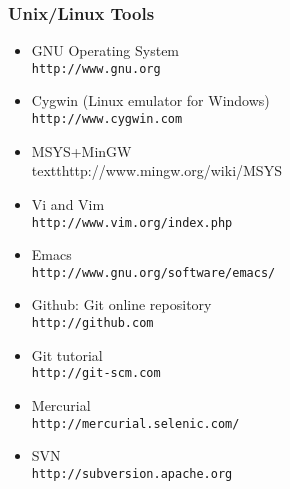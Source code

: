 \documentclass[ChapterTOCs,krantz2]{krantz} %
\begin{document}
\subsubsection{Unix/Linux Tools}
\begin{itemize}
\item GNU Operating System\\\texttt{http://www.gnu.org}
\item Cygwin (Linux emulator for Windows)\\\texttt{http://www.cygwin.com}
\item MSYS+MinGW \\textt{http://www.mingw.org/wiki/MSYS}

\item Vi and Vim\\ \texttt{http://www.vim.org/index.php}
\item Emacs\\ \texttt{http://www.gnu.org/software/emacs/}
\item Github: Git online repository\\ \texttt{http://github.com}
\item Git tutorial \\\texttt{http://git-scm.com}
\item Mercurial \\\texttt{http://mercurial.selenic.com/}
\item SVN \\\texttt{http://subversion.apache.org}
\end{itemize}
\end{document}
